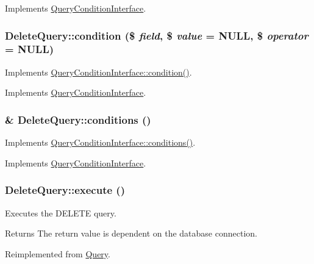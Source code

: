 Implements \hyperlink{interfaceQueryConditionInterface_a4aac3f4505275edecad9c22351e591cb}{QueryConditionInterface}.\hypertarget{classDeleteQuery_ae88c47d15ce798fd7d62620361eb4277}{
\subsubsection[{condition}]{\setlength{\rightskip}{0pt plus 5cm}DeleteQuery::condition (\$ {\em field}, \/  \$ {\em value} = {\ttfamily NULL}, \/  \$ {\em operator} = {\ttfamily NULL})}}
\label{classDeleteQuery_ae88c47d15ce798fd7d62620361eb4277}
Implements \hyperlink{interfaceQueryConditionInterface_aa6d9d96fa17441b5222d1ffddd4c1799}{QueryConditionInterface::condition()}. 

Implements \hyperlink{interfaceQueryConditionInterface_aa6d9d96fa17441b5222d1ffddd4c1799}{QueryConditionInterface}.\hypertarget{classDeleteQuery_a6c7bf743c3747bc37fad92940fc8e753}{
\subsubsection[{conditions}]{\setlength{\rightskip}{0pt plus 5cm}\& DeleteQuery::conditions ()}}
\label{classDeleteQuery_a6c7bf743c3747bc37fad92940fc8e753}
Implements \hyperlink{interfaceQueryConditionInterface_a894cc290ed61feb3693b1d459ae86888}{QueryConditionInterface::conditions()}. 

Implements \hyperlink{interfaceQueryConditionInterface_a894cc290ed61feb3693b1d459ae86888}{QueryConditionInterface}.\hypertarget{classDeleteQuery_a77b0690ed162255ae8a765fed7db0766}{
\subsubsection[{execute}]{\setlength{\rightskip}{0pt plus 5cm}DeleteQuery::execute ()}}
\label{classDeleteQuery_a77b0690ed162255ae8a765fed7db0766}
Executes the DELETE query.

\begin{DoxyReturn}{Returns}
The return value is dependent on the database connection. 
\end{DoxyReturn}


Reimplemented from \hyperlink{classQuery_a9f2326187a94f3337a7838687b1e6929}{Query}.

